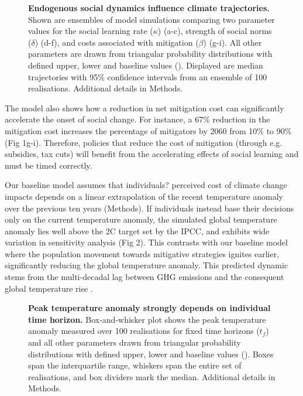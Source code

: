 \documentclass[10pt,letterpaper]{article}
\begin{document}
\begin{figure}[!ht]
\caption{{\bf Endogenous social dynamics influence climate trajectories.}
Shown are
ensembles of model simulations comparing two parameter values for the social learning rate ($\kappa$) (a-c), strength of social norms ($\delta$) (d-f), and costs associated with mitigation ($\beta$)
(g-i). All other parameters are drawn from triangular probability distributions with defined upper, lower and baseline values (). Displayed are median trajectories with 95\% confidence intervals from an ensemble of 100 realisations. Additional details in Methods.}
\label{fig1}
\end{figure}


The model also shows how a reduction in net mitigation cost can significantly accelerate the onset of social change. For instance, a 67\% reduction in the mitigation cost increases the percentage of mitigators by 2060 from 10\% to 90\% (Fig 1g-i). Therefore, policies that reduce the cost of mitigation (through e.g. subsidies, tax cuts) will benefit from the accelerating effects of social learning and must be timed correctly. 

Our baseline model assumes that individuals? perceived cost of climate change impacts depends on a linear extrapolation of the recent temperature anomaly over the previous ten years (Methods). If individuals instead base their decisions only on the current temperature anomaly, the simulated global temperature anomaly lies well above the 2\degree C target set by the IPCC, and exhibits wide variation in sensitivity analysis (Fig 2). This contrasts with our baseline model where the population movement towards mitigative strategies ignites earlier, significantly reducing the global temperature anomaly. This predicted dynamic stems from the multi-decadal lag between GHG emissions and the consequent global temperature rise \cite{hansen05}.

\begin{figure}[!ht]
\caption{{\bf Peak temperature anomaly strongly depends on individual time horizon.}
Box-and-whisker plot shows the peak temperature anomaly measured over 100 realisations for fixed time horizons ($t_f$) and all other parameters drawn from triangular probability distributions with defined upper, lower and baseline values (). Boxes span the interquartile range, whiskers span the entire set of realisations, and box dividers mark the median. Additional details in Methods.}
\label{fig2}
\end{figure}
\end{document}
